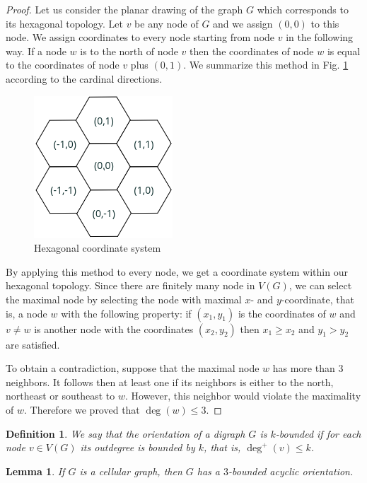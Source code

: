 \documentclass[letterpaper, 10 pt, conference]{ieeeconf}  %
\newtheorem{lem}{Lemma}
\newtheorem{defi}{Definition}
\begin{document}
\begin{proof} Let us consider the planar drawing of the graph $G$ which corresponds to its hexagonal topology.
Let $v$ be any node of $G$ and we assign $(0,0)$ to this node. We assign coordinates to every node starting from node $v$ in the following way. If a node $w$ is to the north of node $v$ then the coordinates of node $w$ is equal to the coordinates of node $v$ plus $(0,1)$. We summarize this method in Fig. \ref{fig:assignment} according to the cardinal directions.
\begin{figure}[!h]
\centering
\includegraphics[scale=0.4]{hexagonal_coordinate_system.png}
\caption{Hexagonal coordinate system}\label{fig:assignment}
\end{figure}
By applying this method to every node, we get a coordinate system within our hexagonal topology. Since there are finitely many node in $V(G)$, we can select the maximal node by selecting the node with maximal $x$- and $y$-coordinate, that is, a node $w$ with the following property: if $(x_1,y_1)$ is the coordinates of $w$ and $v \neq w$ is another node with the coordinates $(x_2,y_2)$ then $x_1 \geqslant x_2$ and $y_1 > y_2$ are satisfied.

To obtain a contradiction, suppose that the maximal node $w$ has more than 3 neighbors. It follows then at least one if its neighbors is either to the north, northeast or southeast to $w$. However, this neighbor would violate the maximality of $w$. Therefore we proved that $\deg(w) \leqslant 3$.
\end{proof}
\begin{defi}
We say that the orientation of a digraph $G$ is $k$\textit{-bounded} if for each node $v \in V(G)$ its outdegree is bounded by $k$, that is, $\deg^+(v) \leqslant k$.
\end{defi}
\begin{lem}\label{lem:bounded-acyclic-orientation}
If $G$ is a cellular graph, then $G$ has a $3$-bounded acyclic orientation.
\end{lem}
\end{document}
